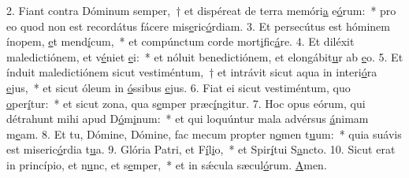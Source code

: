 2. Fiant contra Dóminum semper,~† et dispéreat de terra memóri\uline{a} e\uline{ó}rum:~* pro eo quod non est recordátus fácere mis\uline{e}ric\uline{ó}rdiam.
3. Et persecútus est hóminem ínopem, \uline{e}t mend\uline{í}cum,~* et compúnctum corde mort\uline{i}fic\uline{á}re.
4. Et diléxit maledictiónem, et v\uline{é}niet \uline{e}i:~* et nóluit benedictiónem, et elongábit\uline{u}r ab \uline{e}o.
5. Et índuit maledictiónem sicut vestiméntum,~† et intrávit sicut aqua in interi\uline{ó}ra \uline{e}jus,~* et sicut óleum in \uline{ó}ssibus \uline{e}jus.
6. Fiat ei sicut vestiméntum, quo \uline{o}per\uline{í}tur:~* et sicut zona, qua s\uline{e}mper præc\uline{í}ngitur.
7. Hoc opus eórum, qui détrahunt mihi apud D\uline{ó}m\uline{i}num:~* et qui loquúntur mala advérsus \uline{á}nimam m\uline{e}am.
8. Et tu, Dómine, Dómine, fac mecum propter n\uline{o}men t\uline{u}um:~* quia suávis est miseric\uline{ó}rdia t\uline{u}a.
9. Glória Patri, et F\uline{í}l\uline{i}o,~* et Spir\uline{í}tui S\uline{a}ncto.
10. Sicut erat in princípio, et n\uline{u}nc, et s\uline{e}mper,~* et in sǽcula sæcul\uline{ó}rum. \uline{A}men.

